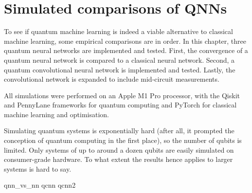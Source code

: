 \chapter{Simulated comparisons of QNNs}
\label{chap:comparison}

To see if quantum machine learning is indeed a viable alternative to classical machine learning, some empirical comparisons are in order.
In this chapter, three quantum neural networks are implemented and tested.
First, the convergence of a quantum neural network is compared to a classical neural network.
Second, a quantum convolutional neural network is implemented and tested.
Lastly, the convolutional network is expanded to include mid-circuit measurements.

All simulations were performed on an Apple M1 Pro processor, with the Qiskit \cite{qiskit} and PennyLane \cite{pennylane} frameworks for quantum computing and PyTorch \cite{pytorch} for classical machine learning and optimisation.

Simulating quantum systems is exponentially hard (after all, it prompted the conception of quantum computing in the first place), so the number of qubits is limited.
Only systems of up to around a dozen qubits are easily simulated on consumer-grade hardware.
To what extent the results hence applies to larger systems is hard to say.

{qnn_vs_nn}
{qcnn}
{qcnn2}